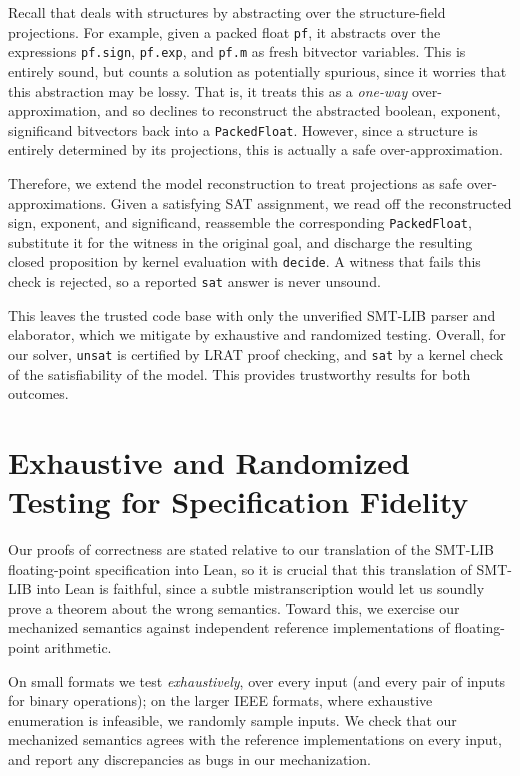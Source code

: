Recall that \bvdecide{} deals with structures by abstracting over the structure-field projections.
For example, given a packed float \texttt{pf}, it abstracts over the expressions
\texttt{pf.sign}, \texttt{pf.exp}, and \texttt{pf.m} as fresh bitvector variables.
This is entirely sound, but \bvdecide{} counts a solution as potentially spurious,
since it worries that this abstraction may be lossy. That is, it treats this as a \emph{one-way} over-approximation,
and so declines to reconstruct the abstracted boolean, exponent, significand bitvectors back into a \texttt{PackedFloat}.
However, since a structure is entirely determined by its projections, this is actually a safe over-approximation.

Therefore, we extend the model reconstruction to treat projections as safe over-approximations.
Given a satisfying SAT assignment, we read off the reconstructed sign, exponent, and significand,
reassemble the corresponding \texttt{PackedFloat}, substitute it for the witness in the
original goal, and discharge the resulting closed proposition by kernel evaluation with \texttt{decide}.
A witness that fails this check is rejected, so a reported \texttt{sat} answer is never unsound.

This leaves the trusted code base with only the unverified SMT-LIB parser and elaborator,
which we mitigate by exhaustive and randomized testing. Overall, for our solver,
\texttt{unsat} is certified by LRAT proof checking,
and \texttt{sat} by a kernel check of the satisfiability of the model.
This provides trustworthy results for both outcomes.

\section{Exhaustive and Randomized Testing for Specification Fidelity}
\label{sec:fp:testing}

Our proofs of correctness are stated relative to our translation of the SMT-LIB
floating-point specification into Lean, so it is crucial that this translation of SMT-LIB into Lean is faithful,
since a subtle mistranscription would let us soundly prove a theorem about the wrong semantics.
Toward this, we exercise our mechanized semantics against independent reference implementations of floating-point arithmetic.

On small formats we test \emph{exhaustively}, over every input (and every
pair of inputs for binary operations); on the larger IEEE formats, where exhaustive
enumeration is infeasible, we randomly sample inputs.
We check that our mechanized semantics agrees with the reference implementations
on every input, and report any discrepancies as bugs in our mechanization.


